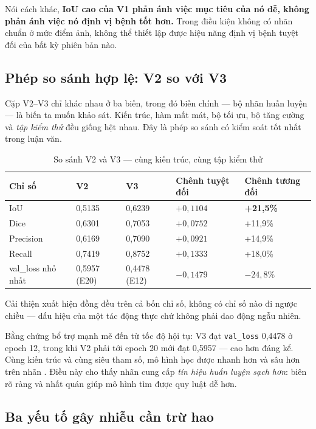 Nói cách khác, \textbf{IoU cao của V1 phản ánh việc mục tiêu của nó dễ, không phản
ánh việc nó định vị bệnh tốt hơn.} Trong điều kiện không có nhãn chuẩn ở mức điểm
ảnh, không thể thiết lập được hiệu năng định vị bệnh tuyệt đối của bất kỳ phiên
bản nào.

\subsection{Phép so sánh hợp lệ: V2 so với V3}

Cặp V2--V3 chỉ khác nhau ở ba biến, trong đó biến chính --- bộ nhãn huấn luyện ---
là biến ta muốn khảo sát. Kiến trúc, hàm mất mát, bộ tối ưu, bộ tăng cường và
\emph{tập kiểm thử} đều giống hệt nhau. Đây là phép so sánh có kiểm soát tốt nhất
trong luận văn.

\begin{table}[H]
\centering
\caption{So sánh V2 và V3 --- cùng kiến trúc, cùng tập kiểm thử}
\label{tab:v2v3}
\begin{tabular}{L{3.1cm} C{1.9cm} C{1.9cm} C{2.3cm} C{2.3cm}}
\toprule
\textbf{Chỉ số} & \textbf{V2} & \textbf{V3} & \textbf{Chênh tuyệt đối} & \textbf{Chênh tương đối} \\
\midrule
IoU       & 0,5135 & 0,6239 & $+0{,}1104$ & \textbf{+21,5\%} \\
Dice      & 0,6301 & 0,7053 & $+0{,}0752$ & +11,9\% \\
Precision & 0,6169 & 0,7090 & $+0{,}0921$ & +14,9\% \\
Recall    & 0,7419 & 0,8752 & $+0{,}1333$ & +18,0\% \\
\midrule
val\_loss nhỏ nhất & 0,5957 (E20) & 0,4478 (E12) & $-0{,}1479$ & $-24{,}8\%$ \\
\bottomrule
\end{tabular}
\end{table}

Cải thiện xuất hiện đồng đều trên cả bốn chỉ số, không có chỉ số nào đi ngược
chiều --- dấu hiệu của một tác động thực chứ không phải dao động ngẫu nhiên.

Bằng chứng bổ trợ mạnh mẽ đến từ tốc độ hội tụ: V3 đạt \texttt{val\_loss} 0,4478 ở
epoch 12, trong khi V2 phải tới epoch 20 mới đạt 0,5957 --- cao hơn đáng kể. Cùng
kiến trúc và cùng siêu tham số, mô hình học được nhanh hơn và sâu hơn trên nhãn
\SAM{}. Điều này cho thấy nhãn \SAM{} cung cấp \emph{tín hiệu huấn luyện sạch hơn}:
biên rõ ràng và nhất quán giúp mô hình tìm được quy luật dễ hơn.

\subsection{Ba yếu tố gây nhiễu cần trừ hao}
\label{subsec:confound}


